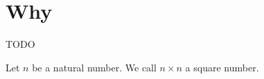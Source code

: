 
\sbasic









\sstart
{}

\section{Why}

TODO


Let $n$ be a natural number.
We call $n\times n$ a square number.
\strats
